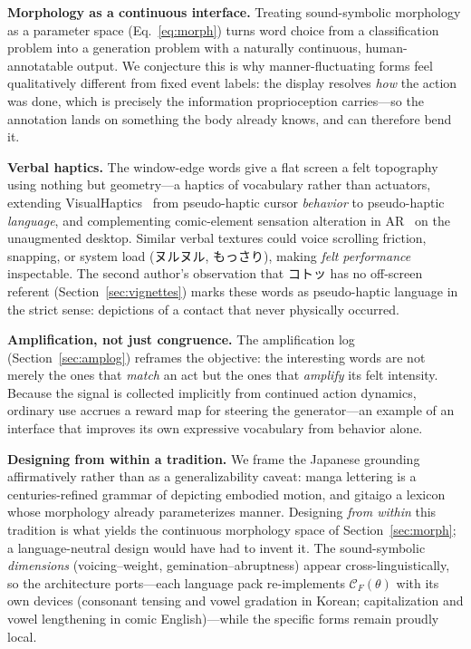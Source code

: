 \documentclass[sigconf,nonacm]{acmart}
\newcommand{\jp}[1]{#1}
\begin{document}
\textbf{Morphology as a continuous interface.} Treating sound-symbolic morphology as a parameter space (Eq.~\ref{eq:morph}) turns word choice from a classification problem into a generation problem with a naturally continuous, human-annotatable output. We conjecture this is why manner-fluctuating forms feel qualitatively different from fixed event labels: the display resolves \emph{how} the action was done, which is precisely the information proprioception carries---so the annotation lands on something the body already knows, and can therefore bend it.

\textbf{Verbal haptics.} The window-edge words give a flat screen a felt topography using nothing but geometry---a haptics of vocabulary rather than actuators, extending VisualHaptics~\cite{watanabe2008visualhaptics} from pseudo-haptic cursor \emph{behavior} to pseudo-haptic \emph{language}, and complementing comic-element sensation alteration in AR~\cite{bhatia2024comics} on the unaugmented desktop. Similar verbal textures could voice scrolling friction, snapping, or system load (\jp{ヌルヌル}, \jp{もっさり}), making \emph{felt performance} inspectable. The second author's observation that \jp{コトッ} has no off-screen referent (Section~\ref{sec:vignettes}) marks these words as pseudo-haptic language in the strict sense: depictions of a contact that never physically occurred.

\textbf{Amplification, not just congruence.} The amplification log (Section~\ref{sec:amplog}) reframes the objective: the interesting words are not merely the ones that \emph{match} an act but the ones that \emph{amplify} its felt intensity. Because the signal is collected implicitly from continued action dynamics, ordinary use accrues a reward map for steering the generator---an example of an interface that improves its own expressive vocabulary from behavior alone.

\textbf{Designing from within a tradition.} We frame the Japanese grounding affirmatively rather than as a generalizability caveat: manga lettering is a centuries-refined grammar of depicting embodied motion, and gitaigo a lexicon whose morphology already parameterizes manner. Designing \emph{from within} this tradition is what yields the continuous morphology space of Section~\ref{sec:morph}; a language-neutral design would have had to invent it. The sound-symbolic \emph{dimensions} (voicing–weight, gemination–abruptness) appear cross-linguistically, so the architecture ports---each language pack re-implements $\mathcal{C}_F(\theta)$ with its own devices (consonant tensing and vowel gradation in Korean; capitalization and vowel lengthening in comic English)---while the specific forms remain proudly local.
\end{document}
